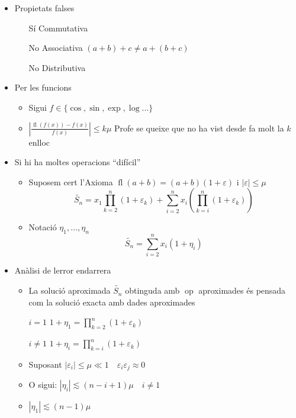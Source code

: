 \documentclass{article}
\DeclareMathOperator{\op}{op}
\DeclareMathOperator{\fl}{fl}
\begin{document}
\begin{itemize}
\item Propietats falses
	\begin{itemize}
	\item[Sí] Commutativa
	\item[No] Associativa $(a+b)+c \neq a+(b+c)$
	\item[No] Distributiva
	\end{itemize}

\item Per les funcions
	\begin{itemize}
	\item Sigui $f \in \{ \cos, \sin, \exp, \log \dots \}$
	\item $\left|\frac{\fl(f(x)) - f(x)}{f(x)}\right| \le k\mu$
		\subitem Profe se queixe que no ha vist desde fa molt la $k$ enlloc
	\end{itemize}
\item Si hi ha moltes operacions ``difícil''
	\begin{itemize}
	\item Suposem cert l'Axioma $\fl(a+b) = (a+b)(1+\varepsilon)$ i $|\varepsilon| \le \mu$
	$$\widetilde{S_n} = x_1 \prod_{k=2}^n (1 + \varepsilon_k) + \sum_{i = 2}^n x_i\left(\prod_{k = i}^n (1+ \varepsilon_k)\right)$$
	\item Notació $\eta_1, \dots, \eta_n$
	$$\widetilde{S_n} = \sum_{i=2}^n x_i(1 + \eta_i)$$
	\end{itemize}

\item Anàlisi de lerror endarrera
	\begin{itemize}
	\item La solució aproximada $\widetilde{S_n}$ obtinguda amb $\op$ aproximades és pensada com la solució exacta amb dades aproximades
	\item[$i = 1$] $1+\eta_1 = \prod_{k=2}^n (1 + \varepsilon_k)$
	\item[$i \neq 1$] $1+\eta_i = \prod_{k=i}^n (1 + \varepsilon_k)$
	\item Suposant $|\varepsilon_i| \le \mu \ll 1 \quad \varepsilon_i \varepsilon_j \approx 0$
	\item O sigui: $|\eta_i| \lesssim (n -i +1)\mu \quad i \neq 1$
	\item $|\eta_1| \lesssim (n -1)\mu$
	\end{itemize}
\end{itemize}
\end{document}
